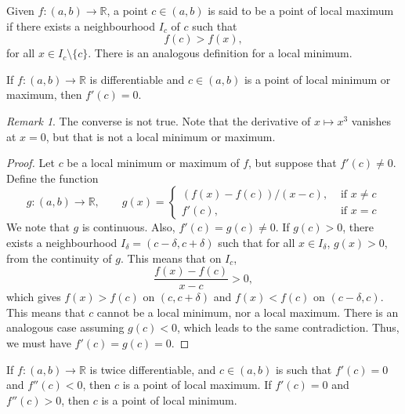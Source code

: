 \documentclass[11pt]{article}
\def\R{\mathbb{R}}
\theoremstyle{definition}
\theoremstyle{remark}
\newtheorem*{remark}{Remark}
\numberwithin{equation}{module}
\begin{document}
    \begin{definition}
        Given $f \colon (a, b) \to \R$, a point $c \in (a, b)$ is said to be a point
        of local maximum if there exists a neighbourhood $I_c$ of $c$ such that \[
            f(c) > f(x),
        \] for all $x \in I_c\setminus\{c\}$.
        There is an analogous definition for a local minimum.
    \end{definition}
    \begin{theorem}
        If $f\colon (a, b) \to \R$ is differentiable and $c \in (a, b)$ is a point
        of local minimum or maximum, then $f'(c) = 0$.
        \begin{remark}
            The converse is not true. Note that the derivative of $x \mapsto x^3$
            vanishes at $x = 0$, but that is not a local minimum or maximum.
        \end{remark}
    \end{theorem}
    \begin{proof}
        Let $c$ be a local minimum or maximum of $f$, but suppose that $f'(c) \neq 0$.
        Define the function \[
            g\colon (a, b) \to \R, \qquad g(x) = \begin{cases}
                (f(x) - f(c))/(x - c), &\text{ if } x \neq c \\                
                f'(c), &\text{ if } x = c
            \end{cases}
        \] We note that $g$ is continuous. Also, $f'(c) = g(c) \neq 0$.
        If $g(c) > 0$, there exists a neighbourhood $I_\delta = (c - \delta, c +
        \delta)$ such that for all $x \in I_\delta$, $g(x) > 0$, from the continuity
        of $g$. This means that on $I_c$, \[
            \frac{f(x) - f(c)}{x - c} > 0,
        \] which gives $f(x) > f(c)$ on $(c, c + \delta)$ and $f(x) < f(c)$ on $(c -
        \delta, c)$. This means that $c$ cannot be a local minimum, nor a local
        maximum. There is an analogous case assuming $g(c) < 0$, which leads to the
        same contradiction. Thus, we must have $f'(c) = g(c) = 0$.
    \end{proof}

    \begin{theorem}
        If $f\colon (a, b)\to \R$ is twice differentiable, and $c \in (a, b)$ is
        such that $f'(c) = 0$ and $f''(c) < 0$, then $c$ is a point of local
        maximum. If $f'(c) = 0$ and $f''(c) > 0$, then $c$ is a point of local
        minimum.
    \end{theorem}
    
\end{document}
